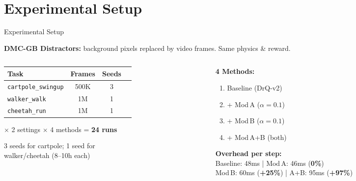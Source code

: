 \documentclass[aspectratio=169]{beamer}
\newcommand{\good}[1]{\textcolor{SuccessGreen}{\textbf{#1}}}
\newcommand{\bad}[1]{\textcolor{DangerRed}{\textbf{#1}}}
\begin{document}
\section{Experimental Setup}

\begin{frame}{Experimental Setup}

\small
\textbf{DMC-GB Distractors:} background pixels replaced by video frames. Same physics \& reward.

\vspace{0.3em}
\begin{columns}[T]
\begin{column}{0.48\textwidth}
\begin{tabular}{lccc}
\toprule
\textbf{Task} & \textbf{Frames} & \textbf{Seeds} \\
\midrule
\texttt{cartpole\_swingup} & 500K & 3 \\
\texttt{walker\_walk} & 1M & 1 \\
\texttt{cheetah\_run} & 1M & 1 \\
\bottomrule
\end{tabular}

\vspace{0.2em}
$\times$ 2 settings $\times$ 4 methods = \textbf{24 runs}

\vspace{0.1em}
{\footnotesize 3 seeds for cartpole; 1 seed for\\walker/cheetah (8--10h each)}
\end{column}
\begin{column}{0.48\textwidth}
\textbf{4 Methods:}
\begin{enumerate}\setlength{\itemsep}{1pt}
    \item Baseline (DrQ-v2)
    \item + Mod\,A ($\alpha = 0.1$)
    \item + Mod\,B ($\alpha = 0.1$)
    \item + Mod\,A+B (both)
\end{enumerate}

\vspace{0.3em}
\textbf{Overhead per step:}\\
{\footnotesize Baseline: 48ms \;|\; Mod\,A: 46ms (\good{0\%})\\
Mod\,B: 60ms (\bad{+25\%}) \;|\; A+B: 95ms (\bad{+97\%})}
\end{column}
\end{columns}
\end{frame}
\end{document}
